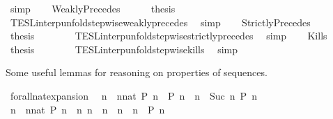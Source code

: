 \begin{isabellebody}
\ simp\isanewline
{}\isamarkupfalse%
\isanewline
\ \ \isamarkupfalse%
\ WeaklyPrecedes\isanewline
\ \ \ \ \isamarkupfalse%
\ {\isacharquery}thesis\isanewline
\ \ \ \ \ \ \isamarkupfalse%
\ TESL{\isacharunderscore}interp{\isacharunderscore}unfold{\isacharunderscore}stepwise{\isacharunderscore}weakly{\isacharunderscore}precedes\ \isamarkupfalse%
\ simp\isanewline
{}\isamarkupfalse%
\isanewline
\ \ \isamarkupfalse%
\ StrictlyPrecedes\isanewline
\ \ \ \ \isamarkupfalse%
\ {\isacharquery}thesis\isanewline
\ \ \ \ \ \ \isamarkupfalse%
\ TESL{\isacharunderscore}interp{\isacharunderscore}unfold{\isacharunderscore}stepwise{\isacharunderscore}strictly{\isacharunderscore}precedes\ \isamarkupfalse%
\ simp\isanewline
{}\isamarkupfalse%
\isanewline
\ \ \isamarkupfalse%
\ Kills\isanewline
\ \ \ \ \isamarkupfalse%
\ {\isacharquery}thesis\isanewline
\ \ \ \ \ \ \isamarkupfalse%
\ TESL{\isacharunderscore}interp{\isacharunderscore}unfold{\isacharunderscore}stepwise{\isacharunderscore}kills\ \isamarkupfalse%
\ simp\isanewline
{}\isamarkupfalse%
%
\endisatagproof
{\isafoldproof}%
%
\isadelimproof
%
\endisadelimproof
%
\begin{isamarkuptext}%
Some useful lemmas for reasoning on properties of sequences.%
\end{isamarkuptext}\isamarkuptrue%
\isamarkupfalse%
\ forall{\isacharunderscore}nat{\isacharunderscore}expansion{\isacharcolon}\isanewline
\ \ {\isacartoucheopen}{\isacharparenleft}{\isasymforall}n\ {\isasymge}\ {\isacharparenleft}nnat{\isacharparenright}{\isachardot}\ P\ n{\isacharparenright}\ {\isacharequal}\ {\isacharparenleft}P\ n\ {\isasymand}\ {\isacharparenleft}{\isasymforall}n\ {\isasymge}\ Suc\ n\ P\ n{\isacharparenright}{\isacharparenright}{\isacartoucheclose}\isanewline
%
\isadelimproof
%
\endisadelimproof
%
\isatagproof
{}\isamarkupfalse%
\ {\isacharminus}\isanewline
\ \ \isamarkupfalse%
\ {\isacartoucheopen}{\isacharparenleft}{\isasymforall}n\ {\isasymge}\ {\isacharparenleft}nnat{\isacharparenright}{\isachardot}\ P\ n{\isacharparenright}\ {\isacharequal}\ {\isacharparenleft}{\isasymforall}n{\isachardot}\ {\isacharparenleft}n\ {\isacharequal}\ n\ {\isasymor}\ n\ {\isachargreater}\ n\ {\isasymlongrightarrow}\ P\ n{\isacharparenright}{\isacartoucheclose}\isanewline

\end{isabellebody}
